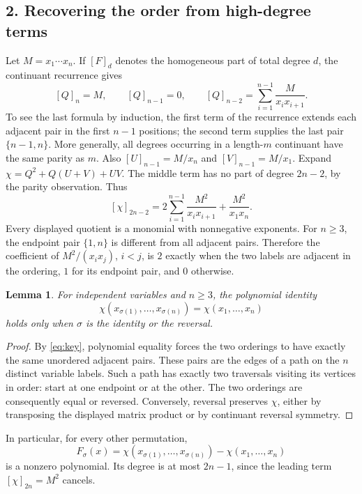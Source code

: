 \documentclass[11pt]{article}
\newtheorem{lemma}{Lemma}
\begin{document}
\subsection*{2. Recovering the order from high-degree terms}
Let $M=x_1\cdots x_n$. If $[F]_d$ denotes the homogeneous part of
total degree $d$, the continuant recurrence gives
\begin{equation}\label{eq:continuantparts}
 [Q]_n=M,\qquad [Q]_{n-1}=0,\qquad
 [Q]_{n-2}=\sum_{i=1}^{n-1}\frac{M}{x_ix_{i+1}}.
\end{equation}
To see the last formula by induction, the first term of the recurrence
extends each adjacent pair in the first $n-1$ positions; the second
term supplies the last pair $\{n-1,n\}$.
More generally, all degrees occurring in a length-$m$ continuant
have the same parity as $m$. Also
$[U]_{n-1}=M/x_n$ and $[V]_{n-1}=M/x_1$.
Expand $\chi=Q^2+Q(U+V)+UV$. The middle term has no part of degree
$2n-2$, by the parity observation. Thus
\begin{equation}\label{eq:key}
 [\chi]_{2n-2}
 =2\sum_{i=1}^{n-1}\frac{M^2}{x_ix_{i+1}}
       +\frac{M^2}{x_1x_n}.
\end{equation}
Every displayed quotient is a monomial with nonnegative exponents.
For $n\ge3$, the endpoint pair $\{1,n\}$ is different from all
adjacent pairs. Therefore the coefficient of $M^2/(x_ix_j)$, $i<j$,
is $2$ exactly when the two labels are adjacent in the ordering,
$1$ for its endpoint pair, and $0$ otherwise.

\begin{lemma}\label{lem:permutations}
For independent variables and $n\ge3$, the polynomial identity
\[
 \chi(x_{\sigma(1)},\ldots,x_{\sigma(n)})
       =\chi(x_1,\ldots,x_n)
\]
holds only when $\sigma$ is the identity or the reversal.
\end{lemma}
\begin{proof}
By \eqref{eq:key}, polynomial equality forces the two orderings to
have exactly the same unordered adjacent pairs. These pairs are the
edges of a path on the $n$ distinct variable labels. Such a path has
exactly two traversals visiting its vertices in order: start at one
endpoint or at the other. The two orderings are consequently equal
or reversed. Conversely, reversal preserves $\chi$, either by
transposing the displayed matrix product or by continuant reversal
symmetry.
\end{proof}
In particular, for every other permutation,
\[
 F_\sigma(x)=\chi(x_{\sigma(1)},\ldots,x_{\sigma(n)})-\chi(x_1,\ldots,x_n)
\]
is a nonzero polynomial. Its degree is at most $2n-1$, since the
leading term $[\chi]_{2n}=M^2$ cancels.
\end{document}
